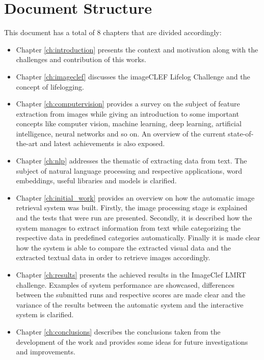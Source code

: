 \section{Document Structure}
This document has a total of 8 chapters that are divided accordingly:




\begin{itemize}
  \item Chapter \ref{ch:introduction} presents the context and motivation along with the challenges and contribution of this works.
  \item Chapter \ref{ch:imageclef} discusses the imageCLEF Lifelog Challenge and the concept of lifelogging.
  \item Chapter \ref{ch:computervision} provides a survey on the subject of feature extraction from images while giving an introduction to some important concepts like computer vision, machine learning, deep learning, artificial intelligence, neural networks and so on. An overview of the current state-of-the-art and latest achievements is also exposed.
  
  \item Chapter \ref{ch:nlp} addresses the thematic of extracting data from text. The subject of natural language processing and respective applications, word embeddings,  useful libraries and  models is clarified.  
  
  
  \item Chapter \ref{ch:initial_work} provides an overview on how the automatic image retrieval system was built. Firstly, the image processing stage is explained and the tests that were run are presented. Secondly, it is described how the system manages to extract information from text while categorizing the respective data in predefined categories automatically. Finally it is made clear how the system is able to compare the extracted visual data and the extracted textual data in order to retrieve images accordingly.
  


  \item Chapter \ref{ch:results} presents the achieved results in the ImageClef LMRT challenge. Examples of system performance are showcased, differences between the submitted runs and respective scores are made clear and the variance of the results between the automatic system and the interactive system is clarified.
  
  \item Chapter \ref{ch:conclusions} describes the conclusions taken from the development of the work and provides some ideas for future investigations and improvements.
  
 
 
\end{itemize}

